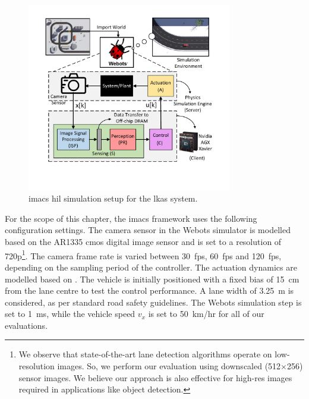 \begin{figure}[t]
	\centering
	\includegraphics[width= 0.8\textwidth]{figs/lkas_block.pdf}
	\caption{{\Gls{imacs} \gls{hil} simulation setup for the \gls{lkas} system.}}
	\label{fig:hilsetup}
\end{figure}

For the scope of this chapter, the \gls{imacs} framework uses the following configuration settings.
The camera sensor in the Webots simulator is modelled based on the AR1335 \gls{cmos} digital image sensor \cite{camsensor} and is set to a resolution of 720p\footnote{We observe that state-of-the-art lane detection algorithms \cite{NvidiaLanenet} operate on low-resolution images. So, we perform our evaluation using downscaled (512$\times$256) sensor images. We believe our approach is also effective for high-res images required in applications like object detection.}. The camera frame rate is varied between 30~fps, 60~fps and 120~fps, depending on the sampling period of the controller. The actuation dynamics are modelled based on \cite{RandyFrank2016}. The vehicle is initially positioned with a fixed bias of 15~cm from the lane centre to test the control performance. A lane width of 3.25~m is considered, as per standard road safety guidelines. The Webots simulation step is set to 1~ms, while the vehicle speed $v_x$ is set to 50~km/hr for all of our evaluations.

